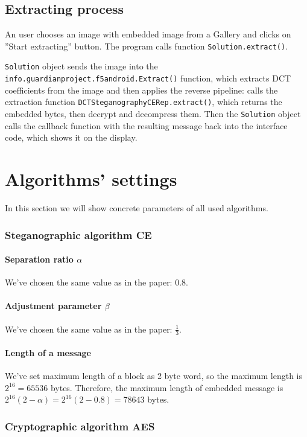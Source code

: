 \subsection{Extracting process}

An user chooses an image with embedded image from a Gallery and clicks on ''Start extracting'' button.
The program calls function \texttt{Solution.extract()}.

\texttt{Solution} object sends the image into the \texttt{info.guardianproject.f5android.Extract()} function,
which extracts DCT coefficients from the image and then applies the reverse pipeline: calls the extraction
function \texttt{DCTSteganographyCERep.extract()}, which returns the embedded bytes, then decrypt
and decompress them. Then the \texttt{Solution} object calls the callback function with the resulting
message back into the interface code, which shows it on the display.

\section{Algorithms' settings}
In this section we will show concrete parameters of all used algorithms.

\subsubsection{Steganographic algorithm CE}

\paragraph{Separation ratio $\alpha$} We've chosen the same value as in the 
paper: $0.8$.

\paragraph{Adjustment parameter $\beta$} We've chosen the same value as in the paper: $\frac{1}{3}$.

\paragraph{Length of a message}
We've set maximum length of a block as 2 byte word, so the maximum length is 
$2^{16} = 65536$ bytes. Therefore, the maximum length of embedded message is 
$2^{16} (2 - \alpha) = 2^{16} (2 - 0.8) = 78643$ bytes.

\subsubsection{Cryptographic algorithm AES}


